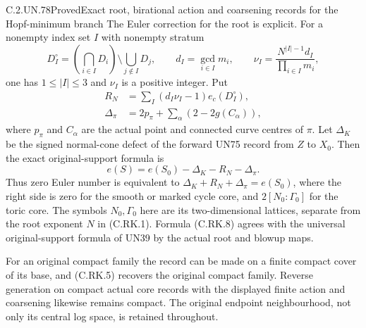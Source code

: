 \begin{statement}{C.2.UN.78}{Proved}{Exact root, birational action and coarsening records for the Hopf-minimum branch}
The Euler correction for the root is explicit.
For a nonempty index set $I$ with nonempty stratum
\[
 D_I^\circ=
    \left(\bigcap_{i\in I}D_i\right)
           \setminus\bigcup_{j\notin I}D_j,
 \qquad d_I=\gcd_{i\in I}m_i,
 \qquad \nu_I=\frac{N^{|I|-1}d_I}{\prod_{i\in I}m_i},
\tag{C.RK.6}
\]
one has $1\le|I|\le3$ and $\nu_I$ is a positive
integer. Put
\[
 \begin{split}
 R_N&=\sum_I(d_I\nu_I-1)e_c(D_I^\circ),\\
 \Delta_\pi&=2p_\pi+
                   \sum_\alpha(2-2g(C_\alpha)),
 \end{split}
\tag{C.RK.7}
\]
where $p_\pi$ and $C_\alpha$ are the actual point
and connected curve centres of $\pi$. Let
$\Delta_K$ be the signed normal-cone defect of
the forward UN75 record from $Z$ to $X_0$.
Then the exact original-support formula is
\[
                e(S)=e(S_0)-\Delta_K-R_N-\Delta_\pi.
\tag{C.RK.8}
\]
Thus zero Euler number is equivalent to
$\Delta_K+R_N+\Delta_\pi=e(S_0)$, where the
right side is zero for the smooth or marked
cycle core, and $2[N_0:\Gamma_0]$ for the
toric core. The symbols $N_0,\Gamma_0$ here
are its two-dimensional lattices, separate
from the root exponent $N$ in (C.RK.1).
Formula (C.RK.8) agrees with the universal
original-support formula of UN39 by the
actual root and blowup maps.

For an original compact family the record can
be made on a finite compact cover of its base,
and (C.RK.5) recovers the original compact
family. Reverse generation on compact actual
core records with the displayed finite action
and coarsening likewise remains compact.
The original endpoint neighbourhood, not only
its central log space, is retained throughout.
\end{statement}

